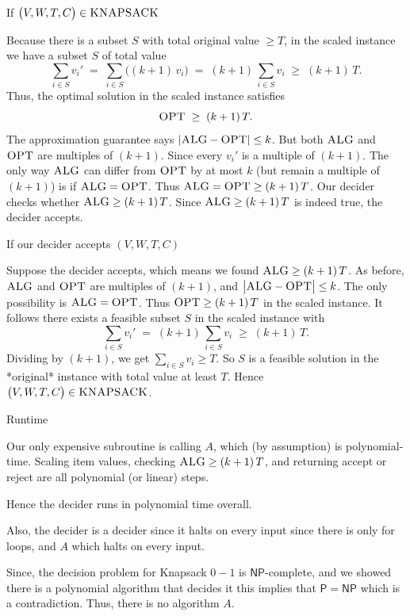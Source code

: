 \documentclass[12pt, letterpaper]{article}
\renewcommand{\P}{\mathsf{P}}
\newcommand{\NP}{\mathsf{NP}}
\begin{document}
\begin{problemproof}
If \(\bigl(V,W,T,C\bigr)\in \textsc{KNAPSACK}\)

Because there is a subset \(S\) with total original value \(\ge T\), in the scaled instance we have a subset \(S\) of total value
  \[
    \sum_{i\in S}v_i' \;=\;\sum_{i\in S}\bigl((k+1)\,v_i\bigr)
    \;=\;(k+1)\,\sum_{i\in S}v_i
    \;\ge\;(k+1)\,T.
  \]
  Thus, the optimal solution in the scaled instance satisfies
  \[
    \textsc{OPT} \;\ge\;(k+1)\,T.
  \]
The approximation guarantee says \(|\textsc{ALG} - \textsc{OPT}| \leq k\).  But both \(\textsc{ALG}\) and \(\textsc{OPT}\) are multiples of \((k+1)\).  Since every \(v_i'\) is a multiple of \((k+1)\). 
The only way \(\textsc{ALG}\) can differ from \(\textsc{OPT}\) by at most \(k\) (but remain a multiple of \((k+1)\)) is if \(\textsc{ALG} = \textsc{OPT}\). 
Thus \(\textsc{ALG} = \textsc{OPT} \ge (k+1)\,T\).
Our decider checks whether \(\textsc{ALG} \ge (k+1)\,T\).  Since \(\textsc{ALG} \ge (k+1)\,T\) is indeed true, the decider accepts.

If our decider accepts \((V,W,T,C)\)

Suppose the decider accepts, which means we found \(\textsc{ALG} \ge (k+1)\,T\).
As before, \(\textsc{ALG}\) and \(\textsc{OPT}\) are multiples of \((k+1)\), and \(\bigl|\textsc{ALG} - \textsc{OPT}\bigr|\le k\).  The only possibility is \(\textsc{ALG} = \textsc{OPT}\).
Thus \(\textsc{OPT} \ge (k+1)\,T\) in the scaled instance.  It follows there exists a feasible subset \(S\) in the scaled instance with 
  \[
    \sum_{i\in S}v_i' \;=\; (k+1)\,\sum_{i\in S}v_i
    \;\ge\;(k+1)\,T.
  \]
  Dividing by \((k+1)\), we get \(\sum_{i\in S}v_i \ge T\).  So \(S\) is a feasible solution in the *original* instance with total value at least \(T\).  Hence \(\bigl(V,W,T,C\bigr)\in \textsc{KNAPSACK}\).

Runtime

Our only expensive subroutine is calling \(A\), which (by assumption) is polynomial-time.  
Scaling item values, checking \(\textsc{ALG}\ge(k+1)\,T\), and returning accept or reject are all polynomial (or linear) steps.  

Hence the decider runs in polynomial time overall.

Also, the decider is a decider since it halts on every input since there is only for loops, and $A$ which halts on every input.

Since, the decision problem for Knapsack $0-1$ is $\NP$-complete, and we showed there is a polynomial algorithm that decides it this implies that $\P = \NP$ which is a contradiction. Thus, there is no algorithm $A$.
\end{problemproof}
\end{document}
